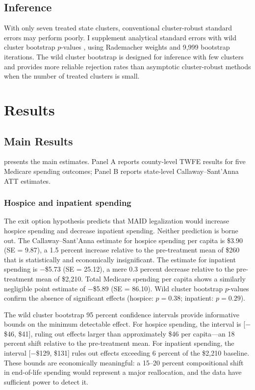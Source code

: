 \documentclass[12pt]{article}
\begin{document}
\subsection{Inference}

With only seven treated state clusters, conventional cluster-robust standard errors may perform poorly. I supplement analytical standard errors with wild cluster bootstrap $p$-values \citep{cameron2008}, using Rademacher weights and 9,999 bootstrap iterations. The wild cluster bootstrap is designed for inference with few clusters and provides more reliable rejection rates than asymptotic cluster-robust methods when the number of treated clusters is small.


\section{Results}
\label{sec:results}

\subsection{Main Results}

 presents the main estimates. Panel A reports county-level TWFE results for five Medicare spending outcomes; Panel B reports state-level Callaway--Sant'Anna ATT estimates.



\subsubsection*{Hospice and inpatient spending}
The exit option hypothesis predicts that MAID legalization would increase hospice spending and decrease inpatient spending. Neither prediction is borne out. The Callaway--Sant'Anna estimate for hospice spending per capita is \$3.90 (SE = 9.87), a 1.5 percent increase relative to the pre-treatment mean of \$260 that is statistically and economically insignificant. The estimate for inpatient spending is $-$\$5.73 (SE = 25.12), a mere 0.3 percent decrease relative to the pre-treatment mean of \$2,210. Total Medicare spending per capita shows a similarly negligible point estimate of $-$\$5.89 (SE = 86.10). Wild cluster bootstrap $p$-values confirm the absence of significant effects (hospice: $p = 0.38$; inpatient: $p = 0.29$).

The wild cluster bootstrap 95 percent confidence intervals provide informative bounds on the minimum detectable effect. For hospice spending, the interval is [$-$\$46, \$41], ruling out effects larger than approximately \$46 per capita---an 18 percent shift relative to the pre-treatment mean. For inpatient spending, the interval [$-$\$129, \$131] rules out effects exceeding 6 percent of the \$2,210 baseline. These bounds are economically meaningful: a 15--20 percent compositional shift in end-of-life spending would represent a major reallocation, and the data have sufficient power to detect it.
\end{document}
